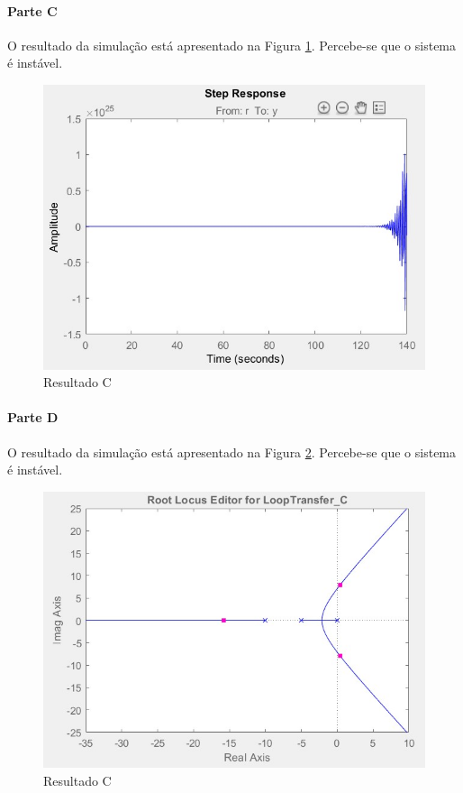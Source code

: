 \documentclass[
]{book}
\theoremstyle{definition}
\theoremstyle{definition}
\theoremstyle{definition}
\theoremstyle{remark}
\begin{document}
\hypertarget{parte-c-10}{%
\paragraph{Parte C}\label{parte-c-10}}

O resultado da simulação está apresentado na Figura \ref{fig:fig10RA7}. Percebe-se que o sistema é instável.

\begin{figure}

{\centering \includegraphics[width=0.5\linewidth]{Imagens/Lab10/Resolução/fig7} 

}

\caption{Resultado C}\label{fig:fig10RA7}
\end{figure}

\hypertarget{parte-d-5}{%
\paragraph{Parte D}\label{parte-d-5}}

O resultado da simulação está apresentado na Figura \ref{fig:fig10RA8}. Percebe-se que o sistema é instável.

\begin{figure}

{\centering \includegraphics[width=0.5\linewidth]{Imagens/Lab10/Resolução/fig8} 

}

\caption{Resultado C}\label{fig:fig10RA8}
\end{figure}
\end{document}
